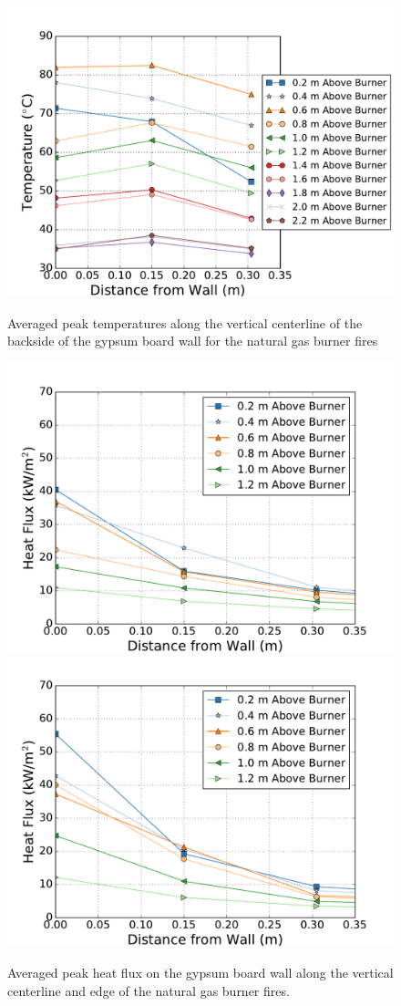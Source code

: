 \documentclass[twoside]{uocthesis}
\begin{document}
\begin{figure}[p]
	\centering
	\includegraphics[width=.625\columnwidth]{../Figures/IWGB_NG_TC_Back_Center_Avg}\\
	\caption[Averaged peak temperatures on the backside of the gypsum board wall for the natural gas burner fires.]{Averaged peak temperatures along the vertical centerline of the backside of the gypsum board wall for the natural gas burner fires}
	\label{IWGB_NG_Temp_RearCenter}
\end{figure}

\begin{figure}
	\centering
	\includegraphics[width=.625\columnwidth]{../Figures/IWGB_NG_HF_Center_Avg}\\
	\includegraphics[width=.625\columnwidth]{../Figures/IWGB_NG_HF_Offset_Avg}\\
	\caption[Averaged peak heat flux on the gypsum board wall for the natural gas burner fires.]{Averaged peak heat flux on the gypsum board wall along the vertical centerline and edge of the natural gas burner fires. }
	\label{IWGB_NG_HF_RearCenter}
\end{figure}
\end{document}
